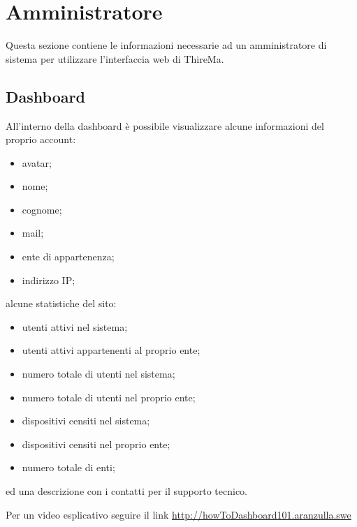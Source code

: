 \section{Amministratore}
Questa sezione contiene le informazioni necessarie ad un amministratore di sistema per utilizzare l'interfaccia web di ThireMa.

\subsection{Dashboard}
All'interno della dashboard è possibile visualizzare alcune informazioni del proprio account:
\begin{itemize}
	\item avatar;
	\item nome;
	\item cognome;
	\item mail;
	\item ente di appartenenza;
	\item indirizzo IP;
\end{itemize}

alcune statistiche del sito:
\begin{itemize}
	\item utenti attivi nel sistema;
	\item utenti attivi appartenenti al proprio ente;
	\item numero totale di utenti nel sistema;
	\item numero totale di utenti nel proprio ente;
	\item dispositivi censiti nel sistema;
	\item dispositivi censiti nel proprio ente;
	\item numero totale di enti;
\end{itemize}

ed una descrizione con i contatti per il supporto tecnico.

Per un video esplicativo seguire il link \url{http://howToDashboard101.aranzulla.swe}